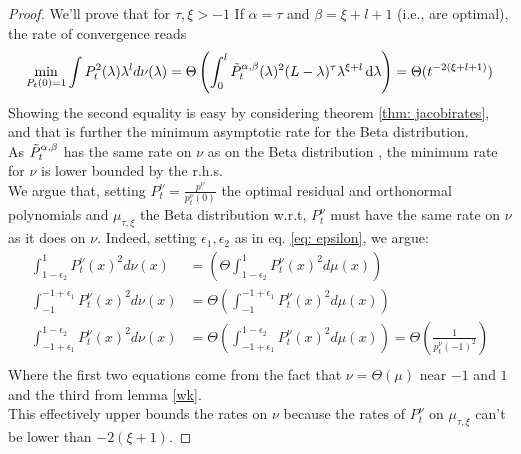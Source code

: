 \documentclass{article}
\begin{document}
\jacoptimal*
\begin{proof}
We'll prove that for $\tau,\xi>-1$ If $\alpha = \tau$ and $\beta = \xi+l+1$ (i.e., are optimal), the rate of convergence reads
\begin{equation}
    \min_{P_t(0)=1}\int P_t^2(\lambda)\lambda^ld\nu(\lambda)=\Theta\left( \int_{0}^l  \Tilde{P}_t^{\alpha,\beta}(\lambda)^2(L-\lambda)^\tau\lambda^{\xi+l}\mathop{}\!\mathrm{d} \lambda\right) =\Theta( t^{-2(\xi+l+1)})
\end{equation}
Showing the second equality is easy by considering theorem \ref{thm: jacobirates}, and that is further the minimum asymptotic rate for the Beta distribution. \\
As $\Tilde{P}^{\alpha,\beta}_t$ has the same rate on $\nu$ as  on the Beta distribution , the minimum rate for $\nu$ is lower bounded by the r.h.s. \\
We argue that, setting $P^\nu_t=\frac{p^\nu}{p^\nu_t(0)}$ the optimal residual and orthonormal polynomials and $\mu_{\tau,\xi}$ the Beta distribution  w.r.t, $P^\nu_t$ must have the same rate on $\nu$ as it does on $\nu$. Indeed, setting $\epsilon_1,\epsilon_2$ as in eq. \ref{eq: epsilon}, we argue:
\begin{align}
    \int_{1-\epsilon_2}^{1}P_t^\nu(x)^2d\nu(x)&=\left(\Theta\int_{1-\epsilon_2}^{1}P_t^\nu(x)^2d\mu(x)\right)\\
    \int_{-1}^{-1+\epsilon_1}P_t^\nu(x)^2d\nu(x)&=\Theta\left(\int_{-1}^{-1+\epsilon_1}P_t^\nu(x)^2d\mu(x)\right)\\
    \int_{-1+\epsilon_1}^{1-\epsilon_2}P_t^\nu(x)^2d\nu(x)&=\Theta\left(\int_{-1+\epsilon_1}^{1-\epsilon_2}P_t^\nu(x)^2d\mu(x)\right)=\Theta\left(\frac{1}{p_t^\nu(-1)^2}\right)\\
\end{align}
Where the first two equations come from the fact that $\nu=\Theta(\mu)$ near $-1$ and $1$ and the third from lemma \ref{wk}.\\
This effectively upper bounds the rates on $\nu$ because the rates of $P_t^\nu$ on $\mu_{\tau,\xi}$ can't be lower than $-2(\xi+1)$.
\end{proof}
\end{document}
